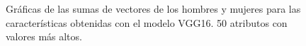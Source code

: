 \documentclass[runningheads]{llncs}
\begin{document}
\begin{figure}[!h]
\caption{Gráficas de las sumas de vectores de los hombres y mujeres para las características obtenidas con el modelo VGG16. 50 atributos con valores más altos.}
\label{img-vgg16-freqs}
\end{figure}


\begin{figure}[!h]
\\

\end{figure}
\end{document}
